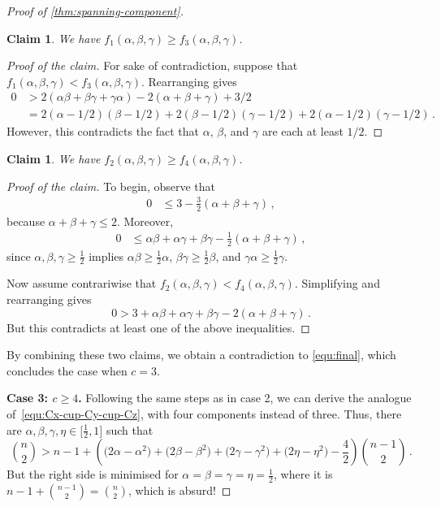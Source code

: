 \documentclass[12pt,reqno]{amsart}
\theoremstyle{plain}
\newtheorem{claim}[theorem]{Claim}
\theoremstyle{definition}
\numberwithin{equation}{section}
\newenvironment{proofclaim}[1][Proof of the claim]{\begin{proof}[#1]\renewcommand*{\qedsymbol}{\(\blacksquare\)}}{\end{proof}}
\newcommand{\al}{\alpha}
\newcommand{\be}{\beta}
\newcommand{\ce}{\gamma}
\begin{document}
\begin{proof}[Proof of \cref{thm:spanning-component}]
		\begin{claim}
			We have $f_1(\alpha,\beta,\gamma)\ge f_3(\alpha,\beta,\gamma)$.
		\end{claim}
		\begin{proofclaim}
			For sake of contradiction, suppose that $f_1(\alpha,\beta,\gamma) < f_3(\alpha,\beta,\gamma)$.
			Rearranging gives
			\begin{align*}
				0 & > 2(\al\be +\be\ce + \ce\al) - 2(\al+\be+\ce) + 3/2 \\ & = 2(\al-1/2)(\be-1/2) + 2(\be-1/2)(\ce-1/2) + 2(\al-1/2)(\ce-1/2)   \,.
			\end{align*}
			However, this contradicts the fact that $\alpha$, $\beta$, and $\gamma$ are each at least $1/2$.
		\end{proofclaim}
		
		\begin{claim}
			We have  $f_2(\alpha,\beta,\gamma)\ge f_4(\alpha,\beta,\gamma)$.
		\end{claim} 
		\begin{proofclaim}
			To begin, observe that 
			\begin{align*}
				0&\le 3-\frac{3}{2}(\al+\be+\ce) \,,
			\end{align*}
			because $\al+\be+\ce\le2$.
			Moreover,
			\begin{align*}
				0&\le \al\be+\al\ce+\be\ce-\frac{1}{2}(\al+\be+\ce)\,,
			\end{align*}
			since $\al,\be,\ce\ge \frac{1}{2}$ implies $\al\be\ge \frac{1}{2}\al$, $\be\ce\ge\frac{1}{2}\be$, and $\ce\al\ge\frac{1}{2}\ce$.
			
			Now assume contrariwise that  $f_2(\alpha,\beta,\gamma) < f_4(\alpha,\beta,\gamma)$.
			Simplifying and rearranging gives
			\[0 > 3+\al\be+\al\ce+\be\ce-2(\al+\be+\ce) \,.\]
			But this contradicts at least one of the above inequalities.
		\end{proofclaim}
		
		By combining these two claims, we obtain a contradiction to \eqref{equ:final}, which concludes the case when $c=3$.
		
		
		
		\medskip
		\textbf{Case 3: $c\geq4$.} Following the same steps as in case 2, we can derive the analogue of~\eqref{equ:Cx-cup-Cy-cup-Cz}, with four components instead of three. Thus, there are $\alpha,\beta,\gamma,\eta\in \big[\frac{1}{2},1\big]$ such that
		\[\binom{n}{2}>n-1+\left(\big(2\al-\al^2\big)+\big(2\be-\be^2\big)+\big(2\ce-\ce^2\big)+\big(2\eta-\eta^2\big)-\frac{4}{2}\right)\binom{n-1}{2} \,.\]
		But the right side is minimised for $\alpha=\beta=\gamma=\eta=\frac{1}{2}$, where it is $n-1+\binom{n-1}{2}=\binom{n}{2}$, which is absurd!
	\end{proof}
	
\end{document}
